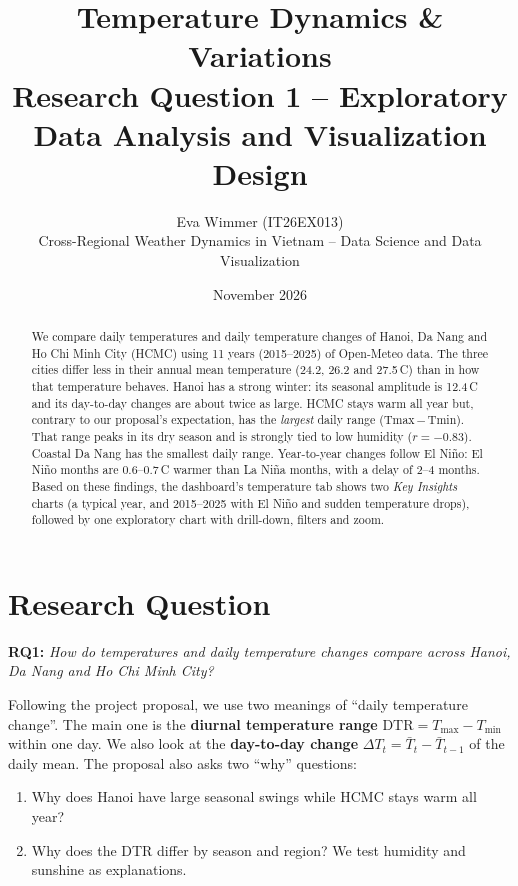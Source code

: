 \documentclass[11pt,a4paper]{article}
\title{Temperature Dynamics \& Variations\\[4pt]
\large Research Question 1 -- Exploratory Data Analysis and Visualization Design}
\author{Eva Wimmer (IT26EX013)\\
\small Cross-Regional Weather Dynamics in Vietnam -- Data Science and Data Visualization}
\date{November 2026}
\begin{document}
\maketitle

\begin{abstract}
\noindent
We compare daily temperatures and daily temperature changes of Hanoi, Da Nang and
Ho Chi Minh City (HCMC) using 11 years (2015--2025) of Open-Meteo data. The three
cities differ less in their annual mean temperature (24.2, 26.2 and 27.5\,\textdegree C) than in
how that temperature behaves. Hanoi has a strong winter: its seasonal amplitude is 12.4\,\textdegree C and its
day-to-day changes are about twice as large. HCMC stays warm all year but, contrary to our proposal's
expectation, has the \emph{largest} daily range (Tmax\,$-$\,Tmin). That range peaks in its dry season and is
strongly tied to low humidity ($r=-0.83$). Coastal Da Nang has the smallest daily range.
Year-to-year changes follow El Niño: El Niño months are 0.6--0.7\,\textdegree C warmer than La Niña months, with a delay of 2--4 months.
Based on these findings, the dashboard's temperature tab shows two \emph{Key Insights} charts
(a typical year, and 2015--2025 with El Niño and sudden temperature drops), followed by one exploratory chart with drill-down,
filters and zoom.
\end{abstract}

\section{Research Question}
\textbf{RQ1:} \emph{How do temperatures and daily temperature changes compare across Hanoi, Da Nang and Ho Chi Minh City?}

Following the project proposal, we use two meanings of ``daily temperature change''.
The main one is the \textbf{diurnal temperature range} $\mathrm{DTR}=T_{\max}-T_{\min}$ within one day.
We also look at the \textbf{day-to-day change} $\Delta T_t = \bar T_t - \bar T_{t-1}$ of the daily mean.
The proposal also asks two ``why'' questions:
\begin{enumerate}
    \item Why does Hanoi have large seasonal swings while HCMC stays warm all year?
    \item Why does the DTR differ by season and region? We test humidity and sunshine as explanations.
\end{enumerate}
\end{document}
